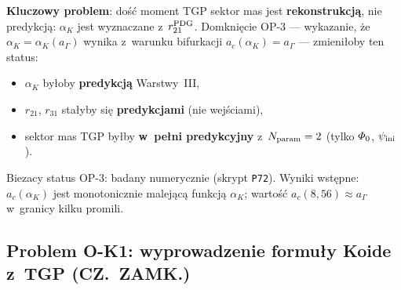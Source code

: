 \begin{remark}%
\label{rem:OP3-koide}
\textbf{Kluczowy problem}: do\'s\'c moment TGP sektor mas jest
\textbf{rekonstrukcj\k{a}}, nie predykcj\k{a}:
$\alpha_K$ jest wyznaczane z~$r_{21}^{\rm PDG}$.
Domkni\k{e}cie OP-3 --- wykazanie,
\.ze $\alpha_K = \alpha_K(a_\Gamma)$ wynika z~warunku
bifurkacji $a_c(\alpha_K) = a_\Gamma$ --- zmieni\l{}oby ten status:
\begin{itemize}[nosep]
  \item $\alpha_K$ by\l{}oby \textbf{predykcj\k{a}} Warstwy~III,
  \item $r_{21}$, $r_{31}$ sta\l{}yby si\k{e} \textbf{predykcjami} (nie wej\'sciami),
  \item sektor mas TGP by\l{}by \textbf{w~pe\l{}ni predykcyjny}
    z~$N_{\rm param} = 2$ (tylko $\varPhi_0$, $\psi_{\rm ini}$).
\end{itemize}
Biezacy status OP-3: badany numerycznie (skrypt \texttt{P72}).
Wyniki wst\k{e}pne: $a_c(\alpha_K)$ jest monotonicznie malej\k{a}c\k{a}
funkcj\k{a} $\alpha_K$; warto\'s\'c $a_c(8{,}56) \approx a_\Gamma$ w~granicy
kilku promili.
\end{remark}

\subsection{Problem O-K1: wyprowadzenie formu\l{}y Koide z~TGP (CZ.~ZAMK.)}%
\label{app:F-koide-open}

